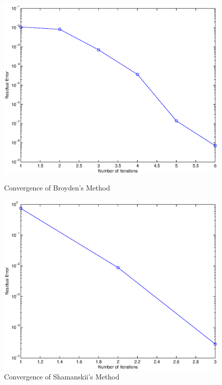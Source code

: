 \documentclass[paper=a4, fontsize=11pt]{scrartcl} %
\numberwithin{equation}{section} %
\numberwithin{figure}{section} %
\numberwithin{table}{section} %
\begin{document}
\begin{figure}[H]
\begin{minipage}{0.5\textwidth}
\centerline{\includegraphics [scale = 0.4] {broydenfig.eps}}
\caption{Convergence of Broyden's Method}
\end{minipage}
\begin{minipage}{0.5\textwidth}
\centerline{\includegraphics [scale = 0.4] {shamfig.eps}}
\caption{Convergence of Shamanskii's Method}
\end{minipage}
\end{figure}
\fi

\end{document}
